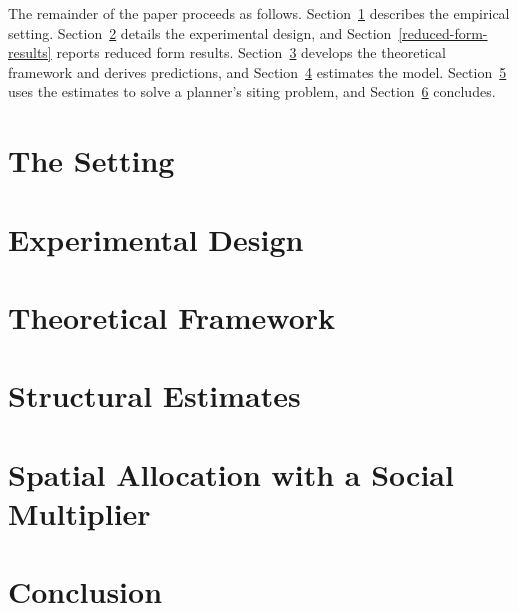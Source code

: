 \documentclass[12pt,a4paper]{article}
\begin{document}
The remainder of the paper proceeds as follows. Section~\ref{setting} describes the empirical setting. Section~\ref{design} details the experimental design, and Section~\ref{reduced-form-results} reports reduced form results. Section~\ref{model} develops the theoretical framework and derives predictions, and Section~\ref{structural} estimates the model. Section~\ref{allocation} uses the estimates to solve a planner's siting problem, and Section~\ref{conclusion} concludes.

\section{The Setting}
\label{setting}

\section{Experimental Design}
\label{design}

\section{Theoretical Framework}
\label{model}

\section{Structural Estimates}
\label{structural}



\section{Spatial Allocation with a Social Multiplier}
\label{allocation}

\section{Conclusion}
\label{conclusion}



\clearpage
\appendix

\end{document}
